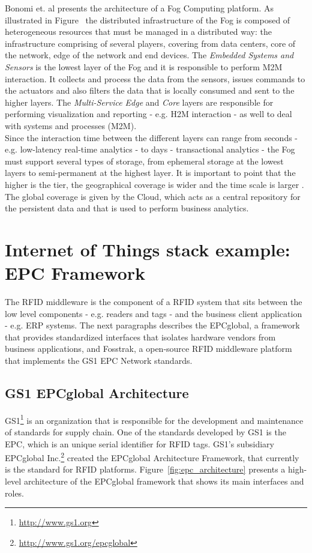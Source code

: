 Bonomi et. al \cite{bonomi2012fog} presents the architecture of a Fog Computing platform. As illustrated
in Figure~\cite{bonomi2012fog} the distributed infrastructure of the Fog is composed of heterogeneous
resources that must be managed in a distributed way: the infrastructure comprising of several players,
covering from data centers, core of the network, edge of the network and end devices. The \textit{Embedded Systems and Sensors}
is the lowest layer of the Fog and it is responsible to perform \gls{M2M} interaction. It collects and
process the data from the sensors, issues commands to the actuators and also filters the data that
is locally consumed and sent to the higher layers. The \textit{Multi-Service Edge} and \textit{Core}
layers are responsible for performing visualization and reporting - e.g. \gls{H2M} interaction -
as well to deal with systems and processes (\gls{M2M}).\\

Since the interaction time between the different layers can range from seconds - e.g. low-latency real-time
analytics - to days - transactional analytics - the Fog must support several types of storage, from
ephemeral storage at the lowest layers to semi-permanent at the highest layer. It is important to point
that the higher is the tier, the geographical coverage is wider and the time scale is larger \cite{bonomi2014fog}.
The global coverage is given by the Cloud, which acts as a central repository for the persistent data
and that is used to perform business analytics.

\section{Internet of Things stack example: EPC Framework}
\label{sec:iot_stack}
The \gls{RFID} middleware is the component of a \gls{RFID} system that sits between the low level
components - e.g. readers and tags - and the business client application - e.g. \gls{ERP} systems.
The next paragraphs describes the EPCglobal, a framework that provides standardized interfaces that
isolates hardware vendors from business applications, and Fosstrak, a open-source \gls{RFID}
middleware platform that implements the GS1 \gls{EPC} Network standards.

\subsection{GS1 EPCglobal Architecture}
\label{subs:epc_network}
GS1\footnote{\url{http://www.gs1.org}} is an organization that is responsible for the development and maintenance of standards for
supply chain. One of the standards developed by GS1 is the \gls{EPC}, which is an unique serial identifier
for \gls{RFID} tags. GS1's subsidiary EPCglobal Inc.\footnote{\url{http://www.gs1.org/epcglobal}} created
the EPCglobal Architecture Framework, that currently is the standard for \gls{RFID} platforms.
Figure~\ref{fig:epc_architecture} presents a high-level architecture of the EPCglobal framework
that shows its main interfaces and roles.\\

